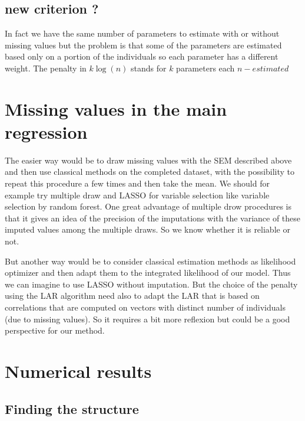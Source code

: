 \documentclass[12pt,a4paper]{report}
\begin{document}
%	
			
			\subsection{new criterion ?}		
			In fact we have the same number of parameters to estimate with or without missing values but the problem is that some of the parameters are estimated based only on a portion of the individuals so each parameter has a different weight.
			The penalty in $k\log(n)$ stands for $k$ parameters each $n-estimated$
			
	\section{Missing values in the main regression}
		The easier way would be to draw missing values with the SEM described above and then use classical methods on the completed dataset, with the possibility to repeat this procedure a few times and then take the mean. We should for example try multiple draw and LASSO for variable selection like variable selection by random forest. One great advantage of multiple drow procedures is that it gives an idea of the precision of the imputations with the variance of these imputed values among the multiple draws. So we know whether it is reliable or not. 
		
		But another way would be to consider classical estimation methods as likelihood optimizer and then adapt them to the integrated likelihood of our model. Thus we can imagine to use LASSO without imputation. But the choice of the penalty using the LAR algorithm need also to adapt the LAR that is based on correlations that are computed on vectors with distinct number of individuals (due to missing values). So it requires a bit more reflexion but could be a good perspective for our method.
	\section{Numerical results}
		\subsection{Finding the structure}
\end{document}
